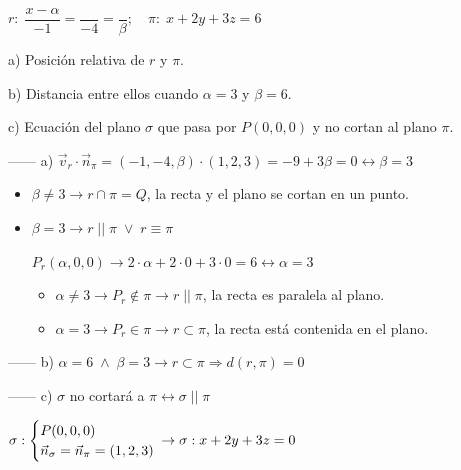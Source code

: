 \begin{ejre}
	$r:\; \dfrac{x-\alpha}{-1}=\dfrac{}{-4}=\dfrac{}{\beta};\quad \pi:\; x+2y+3z=6$

a) Posición relativa de $r$ y $\pi$.

b) Distancia entre ellos cuando $\alpha=3$ y $\beta=6$.

c) Ecuación del plano $\sigma$ que pasa por $P(0,0,0)$ y no cortan al plano $\pi$.
\end{ejre}
\begin{proofw}\renewcommand{\qedsymbol}{$\diamond$}	
	
\noindent ------ a) $\vec v_r \cdot \vec n_{\pi}=(-1,-4,\beta)\cdot (1,2,3)=-9+3\beta=0 \leftrightarrow \beta=3$

\begin{itemize}
\item $\beta \neq 3 \to r \cap \pi=Q$, la recta y el plano se cortan en un punto.
\item $\beta =3 \to r\;||\;\pi \; \vee \; r\equiv \pi$

$P_r(\alpha,0,0)\to 2\cdot\alpha + 2\cdot 0 +3 \cdot 0 =6	\leftrightarrow \alpha =3$
	\begin{itemize}
		\item $\alpha \neq 3 \to P_r \notin \pi \to r\;||\;\pi$, la recta es paralela al plano.
		\item $\alpha = 3 \to P_r \in \pi \to r\subset \pi$, la recta está contenida en el plano.
	\end{itemize}
\end{itemize}

\noindent ------ b) $\alpha=6\; \wedge \; \beta=3 \to r \subset \pi \Rightarrow d(r,\pi)=0$

\noindent ------ c) $\sigma$ no cortará a $\pi \leftrightarrow \sigma\;||\;\pi$

\noindent $\sigma:\begin{cases} P(0,0,0)\\ \vec n_{\sigma}=\vec n_{\pi}=(1,2,3) \end{cases} \hspace{-3mm}\to \sigma: x+2y+3z=0$

\end{proofw}


